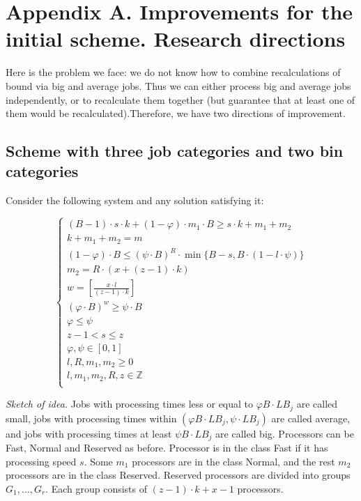 \documentclass[a4paper, preprint, authoryear]{elsarticle}
\begin{document}


\section{Appendix A. Improvements for the initial scheme. Research directions}


Here is the problem we face: we do not know how to combine recalculations 
of bound via big and average jobs.
Thus we can either process big and average jobs independently, or to recalculate them together (but guarantee that at least one of them would
be recalculated).Therefore, we have two directions of improvement.

\subsection*{Scheme with three job categories and two bin categories}

Consider the following system and any solution satisfying it:

\begin{equation}
    \begin{cases}
        (B - 1) \cdot s \cdot k + (1 - \varphi) \cdot m_1 \cdot B \geq s \cdot k + m_1 + m_2 \\
        k + m_1 + m_2 = m \\
        (1 - \varphi) \cdot B \leq (\psi \cdot B)^{R} \cdot \min \{ B - s, B \cdot (1 - l \cdot \psi) \} \\
        m_2 = R \cdot (x + (z - 1) \cdot k)  \\
        w = [\frac{x \cdot l}{(z - 1) \cdot k}] \\
        (\varphi \cdot  B) ^ w \geq \psi \cdot B \\
        \varphi \leq \psi \\
        z - 1 < s \leq z \\
        \varphi, \psi  \in [0, 1] \\
        l, R, m_1, m_2 \geq 0 \\
        l, m_1, m_2, R, z \in \mathbb{Z} \\
    \end{cases}
\end{equation}

{\it Sketch of idea.} Jobs with processing times less or equal to 
$\varphi B \cdot LB_j$ are called small,
jobs with processing times within $(\varphi B \cdot LB_j, \psi \cdot LB_j)$ 
are called average, and jobs with processing times
at least $\psi B \cdot LB_j$ are called big.
Processors can be Fast, Normal and Reserved as before.
Processor is in the class Fast if it has processing speed $s$. 
Some $m_1$ processors are in
the class Normal, and the rest $m_2$ processors are in the class Reserved.
Reserved processors are divided into groups $G_1, \ldots, G_r$. Each group
consists of $(z - 1) \cdot k + x - 1$ processors.
\end{document}

